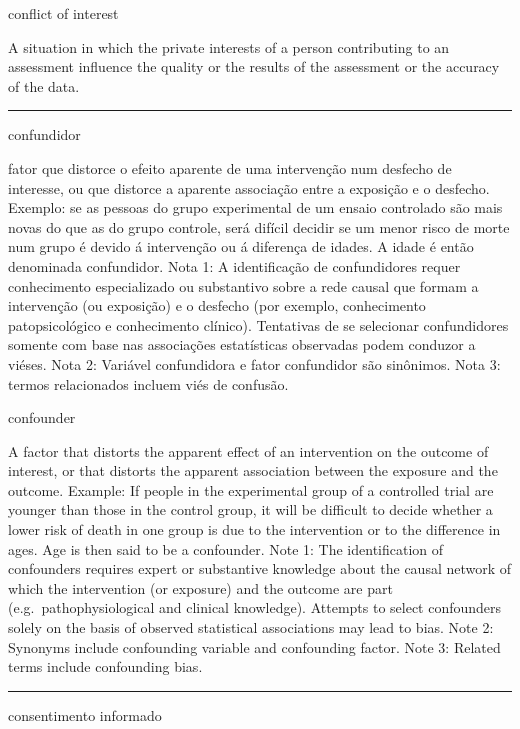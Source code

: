 \documentclass[
]{book}
\begin{document}
conflict of interest

A situation in which the private interests of a person contributing to an assessment influence the quality or the results of the assessment or the accuracy of the data.

\begin{center}\rule{0.5\linewidth}{0.5pt}\end{center}

confundidor

fator que distorce o efeito aparente de uma intervenção num desfecho de interesse, ou que distorce a aparente associação entre a exposição e o desfecho. Exemplo: se as pessoas do grupo experimental de um ensaio controlado são mais novas do que as do grupo controle, será difícil decidir se um menor risco de morte num grupo é devido á intervenção ou á diferença de idades. A idade é então denominada confundidor. Nota 1: A identificação de confundidores requer conhecimento especializado ou substantivo sobre a rede causal que formam a intervenção (ou exposição) e o desfecho (por exemplo, conhecimento patopsicológico e conhecimento clínico). Tentativas de se selecionar confundidores somente com base nas associações estatísticas observadas podem conduzor a viéses. Nota 2: Variável confundidora e fator confundidor são sinônimos. Nota 3: termos relacionados incluem viés de confusão.

confounder

A factor that distorts the apparent effect of an intervention on the outcome of interest, or that distorts the apparent association between the exposure and the outcome. Example: If people in the experimental group of a controlled trial are younger than those in the control group, it will be difficult to decide whether a lower risk of death in one group is due to the intervention or to the difference in ages. Age is then said to be a confounder. Note 1: The identification of confounders requires expert or substantive knowledge about the causal network of which the intervention (or exposure) and the outcome are part (e.g.~pathophysiological and clinical knowledge). Attempts to select confounders solely on the basis of observed statistical associations may lead to bias. Note 2: Synonyms include confounding variable and confounding factor. Note 3: Related terms include confounding bias.

\begin{center}\rule{0.5\linewidth}{0.5pt}\end{center}

consentimento informado
\end{document}
